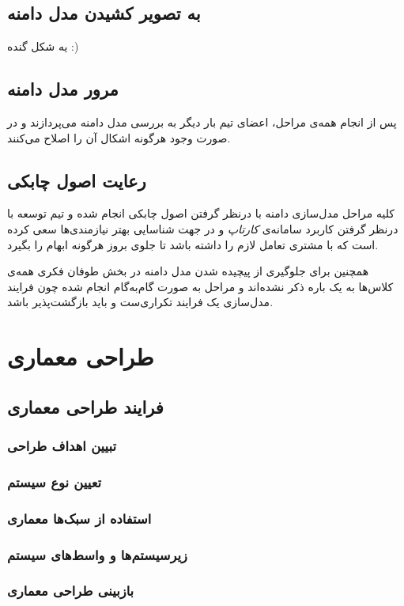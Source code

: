 \documentclass[12pt,svgnames,oneside]{book}
\begin{document}
		\section{به تصویر کشیدن مدل دامنه}
			یه شکل گنده :)
		\section{مرور مدل دامنه}
			پس از انجام همه‌ی مراحل، اعضای تیم بار دیگر به بررسی مدل دامنه می‌پردازند و در صورت وجود هرگونه اشکال آن را اصلاح می‌کنند.
			
		\section{رعایت اصول چابکی}
			کلیه مراحل مدل‌سازی دامنه با درنظر گرفتن اصول چابکی انجام شده و تیم توسعه با درنظر گرفتن کاربرد سامانه‌ی \textit{کارتاپ} و در جهت شناسایی بهتر نیازمندی‌ها سعی کرده است که با مشتری تعامل لازم را داشته باشد تا جلوی بروز هرگونه ابهام را بگیرد.
			
			همچنین برای جلوگیری از پیچیده‌ شدن مدل دامنه در بخش طوفان فکری همه‌ی کلاس‌ها به یک باره ذکر نشده‌اند و مراحل به صورت گام‌به‌گام انجام شده چون فرایند مدل‌سازی یک فرایند تکراری‌ست و باید بازگشت‌پذیر باشد.
		
	\chapter{طراحی معماری}
		\section{فرایند طراحی معماری}
			\subsection{تبیین اهداف طراحی}
			\subsection{تعیین نوع سیستم}
			\subsection{استفاده از سبک‌ها معماری}
			\subsection{زیرسیستم‌‌ها و واسط‌های سیستم}
			\subsection{بازبینی طراحی معماری}
\end{document}
